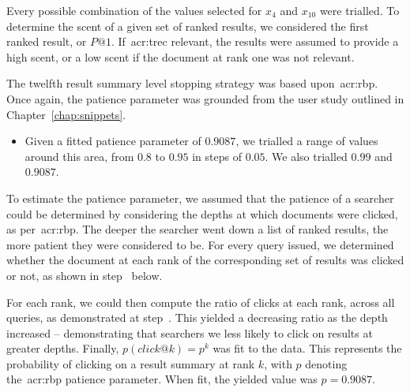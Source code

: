 Every possible combination of the values selected for $x_4$ and $x_{10}$ were trialled. To determine the scent of a given set of ranked results, we considered the first ranked result, or $P@1$. If~\gls{acr:trec} relevant, the results were assumed to provide a high scent, or a low scent if the document at rank one was not relevant.

The twelfth result summary level stopping strategy was based upon~\gls{acr:rbp}. Once again, the patience parameter was grounded from the user study outlined in Chapter~\ref{chap:snippets}.

\begin{itemize}
    \item{ Given a fitted patience parameter of $0.9087$, we trialled a range of values around this area, from $0.8$ to $0.95$ in steps of $0.05$. We also trialled $0.99$ and $0.9087$.}
\end{itemize}

To estimate the patience parameter, we assumed that the patience of a searcher could be determined by considering the depths at which documents were clicked, as per~\gls{acr:rbp}. The deeper the searcher went down a list of ranked results, the more patient they were considered to be. For every query issued, we determined whether the document at each rank of the corresponding set of results was clicked or not, as shown in step~ below.

\begin{figure}[h]
    \centering
    \vspace{1mm}
    \label{fig:rbp_patience}
    \vspace{-7mm}
\end{figure}

For each rank, we could then compute the ratio of clicks at each rank, across all queries, as demonstrated at step~. This yielded a decreasing ratio as the depth increased -- demonstrating that searchers we less likely to click on results at greater depths. Finally, $p(click@k) = p^k$ was fit to the data. This represents the probability of clicking on a result summary at rank $k$, with $p$ denoting the~\gls{acr:rbp} patience parameter. When fit, the yielded value was $p=0.9087$.

